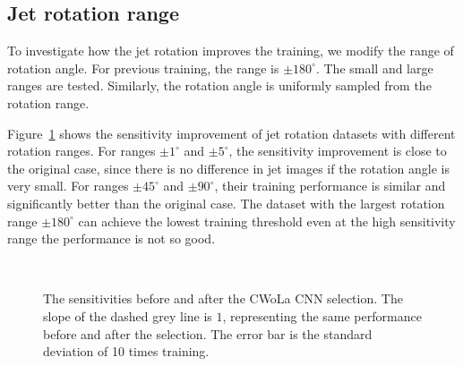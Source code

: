 \documentclass[12pt]{article}
\begin{document}
	\subsection{Jet rotation range}%
	\label{sub:jet_rotation_range}
		To investigate how the jet rotation improves the training, we modify the range of rotation angle. For previous training, the range is $\pm 180^\circ$. The small and large ranges are tested. Similarly, the rotation angle is uniformly sampled from the rotation range.

		Figure~\ref{fig:sensitivity_improvement_origin_jet_aug_5_range_1_5_45_90_180} shows the sensitivity improvement of jet rotation datasets with different rotation ranges. For ranges $\pm 1^\circ$ and $\pm 5^\circ$, the sensitivity improvement is close to the original case, since there is no difference in jet images if the rotation angle is very small. For ranges $\pm 45^\circ$ and  $\pm 90^\circ$, their training performance is similar and significantly better than the original case. The dataset with the largest rotation range $\pm 180^\circ$ can achieve the lowest training threshold even at the high sensitivity range the performance is not so good.
		\begin{figure}[htpb]
			\centering
			 \\
			\caption{The sensitivities before and after the CWoLa CNN selection. The slope of the dashed grey line is $1$, representing the same performance before and after the selection. The error bar is the standard deviation of 10 times training.}
			\label{fig:sensitivity_improvement_origin_jet_aug_5_range_1_5_45_90_180}
		\end{figure}
\end{document}
